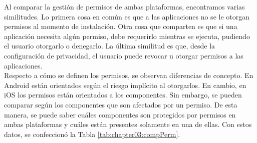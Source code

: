Al comparar la gestión de permisos de ambas plataformas, encontramos varias similitudes. Lo primera cosa en común es que a las aplicaciones no se le otorgan permisos al momento de instalación. Otra cosa que comparten es que si una aplicación necesita algún permiso, debe requerirlo mientras se ejecuta, pudiendo el usuario otorgarlo o denegarlo. La última similitud es que, desde la configuración de privacidad, el usuario puede revocar u otorgar permisos a las aplicaciones.\\

Respecto a cómo se definen los permisos, se observan diferencias de concepto. En Android están orientados según el riesgo implícito al otorgarlos. En cambio, en iOS los permisos están orientados a los componentes. Sin embargo, se pueden comparar según los componentes que son afectados por un permiso. De esta manera, se puede saber cuáles componentes son protegidos por permisos en ambas plataformas y cuáles están presentes solamente en una de ellas. Con estos datos, se confeccionó la Tabla \ref{tab:chapter03:compPerm}.\\

